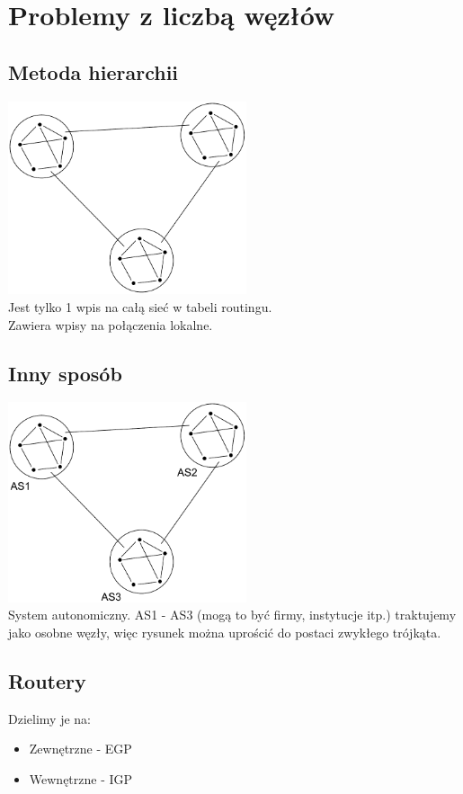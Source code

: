 \documentclass[a4paper,twoside]{article}
\begin{document}
	\section{Problemy z liczbą węzłów}
		\subsection{Metoda hierarchii}
			\includegraphics[width=7.0cm]{./images/image46.pdf}\\
			Jest tylko 1 wpis na całą sieć w tabeli routingu.\\
			Zawiera wpisy na połączenia lokalne.
		\subsection{Inny sposób}
			\includegraphics[width=7.0cm]{./images/image47.pdf}\\
			System autonomiczny. AS1 - AS3 (mogą to być firmy, instytucje itp.) traktujemy jako osobne węzły, więc rysunek można uprościć do postaci zwykłego trójkąta.
		\subsection{Routery}
			Dzielimy je na:
			\begin{itemize}
				\item Zewnętrzne - EGP
				\item Wewnętrzne - IGP
			\end{itemize}
	
\end{document}

